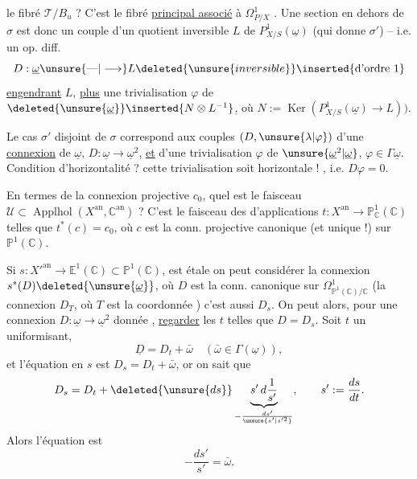 le fibré $\mathcal T/B_u$  ? C'est le fibré \uline{principal associé} à $\Omega^1_{P/X}$ . Une section en dehors de $\sigma$ est donc  un couple d'un quotient inversible $L$ de $P^1_{X/S}(\underline\omega)$ (qui donne $\sigma'$) -- i.e. un op. diff.
\[
D:\underline\omega\unsure{\text{---}|\longrightarrow}L\deleted{\unsure{inversible}}\inserted{\text{d'ordre 1}}
\]
\uline{engendrant} $L$, \uline{plus} une trivialisation $\varphi$ de $\deleted{\unsure{\underline\omega}}\inserted{N\otimes L^{-1}}$, où $N:=\operatorname{Ker}(P^1_{X/S}(\underline\omega)\longrightarrow L))$.

Le cas $\sigma'$ disjoint de $\sigma$ correspond aux couples $(D,\unsure{\lambda|\varphi})$ d'une \uline{connexion} de $\underline\omega$, $D:\underline\omega\longrightarrow\underline\omega^2$, \uline{et} d'une trivialisation $\varphi$ de $\unsure{\underline\omega^2|\underline\omega}$, $\varphi\in\Gamma\underline\omega$.
Condition d'horizontalité ?  cette trivialisation soit horizontale !  , i.e. $D\varphi=0$.

En termes de la connexion projective $c_0$, quel est le faisceau $\mathcal U\subset\operatorname{Applhol}(X^{\mathrm{an}},\mathbb C^{\mathrm{an}})$ ? C'est le faisceau des  d'applications  $t:X^{\mathrm{an}}\longrightarrow\mathbb P^1_{\mathbb C}(\mathbb C)$ telles que $t^*(c)=c_0$, où $c$ est la conn. projective canonique (et unique !) sur $\mathbb P^1(\mathbb C)$.

 Si $s:X'^{\mathrm{an}}\longrightarrow\mathbb E^1(\mathbb C)\subset\mathbb P^1(\mathbb C)$, est étale on peut considérer la connexion  $s^*(D)\deleted{\unsure{\underline\omega}}$, où $D$ est la conn. canonique sur $\Omega^1_{\mathbb P^1(\mathbb C)/\mathbb C}$ \deleted{$\unsure{\varphi}$} (la connexion $D_T$, où $T$ est la coordonnée ) c'est aussi $D_s$. On peut alors,  pour une connexion  $D:\underline\omega\longrightarrow\underline\omega^2$ donnée , \uline{regarder} les $t$ telles que $D=D_s$.  Soit $t$ un uniformisant, 
\[
\underline D=D_t+\bar\omega\quad(\bar\omega\in\Gamma(\underline\omega)),
\]
et l'équation en $s$ est $D_s=D_t+\bar\omega$, or on sait que
\[
D_s=D_t+\deleted{\unsure{ds}}\underbrace{s'\,d\frac1{s'}}_{-\frac{ds'}{\unsure{s'|s'^2}}},\qquad s':=\frac{ds}{dt}.
\]
Alors l'équation est
\[
-\frac{ds'}{s'}=\bar\omega.
\]

